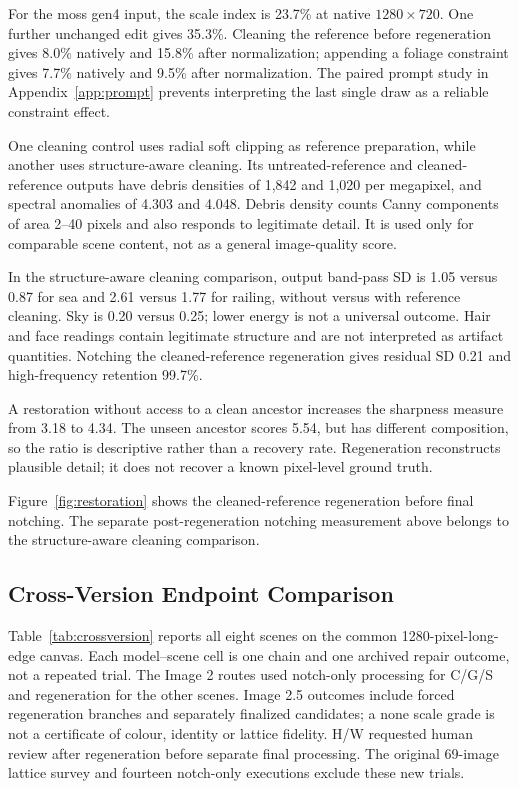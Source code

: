 \documentclass[sigplan,10pt,nonacm]{acmart}
\begin{document}
For the moss gen4 input, the scale index is 23.7\% at native $1280\times720$. One further unchanged edit gives 35.3\%. Cleaning the reference before regeneration gives 8.0\% natively and 15.8\% after normalization; appending a foliage constraint gives 7.7\% natively and 9.5\% after normalization. The paired prompt study in Appendix~\ref{app:prompt} prevents interpreting the last single draw as a reliable constraint effect.

One cleaning control uses radial soft clipping as reference preparation, while another uses structure-aware cleaning. Its untreated-reference and cleaned-reference outputs have debris densities of 1,842 and 1,020 per megapixel, and spectral anomalies of 4.303 and 4.048. Debris density counts Canny components of area 2--40 pixels and also responds to legitimate detail. It is used only for comparable scene content, not as a general image-quality score.

In the structure-aware cleaning comparison, output band-pass SD is 1.05 versus 0.87 for sea and 2.61 versus 1.77 for railing, without versus with reference cleaning. Sky is 0.20 versus 0.25; lower energy is not a universal outcome. Hair and face readings contain legitimate structure and are not interpreted as artifact quantities. Notching the cleaned-reference regeneration gives residual SD 0.21 and high-frequency retention 99.7\%.

A restoration without access to a clean ancestor increases the sharpness measure from 3.18 to 4.34. The unseen ancestor scores 5.54, but has different composition, so the ratio is descriptive rather than a recovery rate. Regeneration reconstructs plausible detail; it does not recover a known pixel-level ground truth.

Figure~\ref{fig:restoration} shows the cleaned-reference regeneration before final notching. The separate post-regeneration notching measurement above belongs to the structure-aware cleaning comparison.

\subsection{Cross-Version Endpoint Comparison}
\label{app:crossversion}
Table~\ref{tab:crossversion} reports all eight scenes on the common 1280-pixel-long-edge canvas. Each model--scene cell is one chain and one archived repair outcome, not a repeated trial. The Image 2 routes used notch-only processing for C/G/S and regeneration for the other scenes. Image 2.5 outcomes include forced regeneration branches and separately finalized candidates; a none scale grade is not a certificate of colour, identity or lattice fidelity. H/W requested human review after regeneration before separate final processing. The original 69-image lattice survey and fourteen notch-only executions exclude these new trials.
\end{document}
